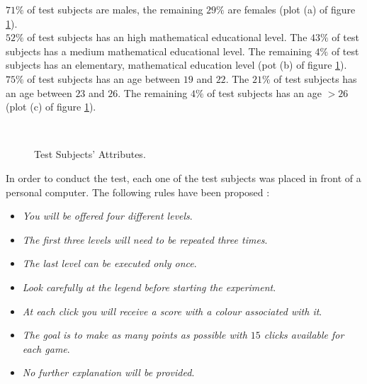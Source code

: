 $71\%$ of test subjects are males, the remaining $29\%$ are females (plot (a) of figure \ref{fig:testSubjectsAttributes}). \\

$52\%$ of test subjects has an high mathematical educational level. The $43\%$ of test subjects has a medium mathematical educational level. The remaining $4\%$ of test subjects has an elementary, mathematical education level (pot (b) of figure \ref{fig:testSubjectsAttributes}). \\

$75\%$ of test subjects has an age between $19$ and $22$. The $21\%$ of test subjects has an age between $23$ and $26$. The remaining $4\%$ of test subjects has an age $> 26$ (plot (c) of figure \ref{fig:testSubjectsAttributes}). \\

\begin{figure}[h!]
	\begin{center}
		\\
	\end{center}
	\caption{
		Test Subjects' Attributes.
	}
	\label{fig:testSubjectsAttributes}
\end{figure}

In order to conduct the test, each one of the test subjects was placed in front of a personal computer. The following rules have been proposed :

\begin{itemize}
	\item \textit{You will be offered four different levels}.
	\item \textit{The first three levels will need to be repeated three times}.
	\item \textit{The last level can be executed only once}.
	\item \textit{Look carefully at the legend before starting the experiment}.
	\item \textit{At each click you will receive a score with a colour associated with it}.
	\item \textit{The goal is to make as many points as possible with $15$ clicks available for each game}.
	\item \textit{No further explanation will be provided}.
\end{itemize}

